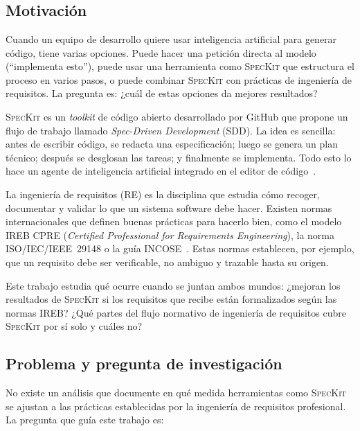 \chapter{\introductionname}
\label{chap:introduccion}

\section{Motivaci\'on}

Cuando un equipo de desarrollo quiere usar inteligencia artificial para generar c\'odigo, tiene varias opciones. Puede hacer una petici\'on directa al modelo (``implementa esto''), puede usar una herramienta como \textsc{SpecKit} que estructura el proceso en varios pasos, o puede combinar \textsc{SpecKit} con pr\'acticas de ingenier\'ia de requisitos. La pregunta es: ¿cu\'al de estas opciones da mejores resultados?

\textsc{SpecKit} es un \emph{toolkit} de c\'odigo abierto desarrollado por GitHub que propone un flujo de trabajo llamado \emph{Spec-Driven Development} (SDD). La idea es sencilla: antes de escribir c\'odigo, se redacta una especificaci\'on; luego se genera un plan t\'ecnico; despu\'es se desglosan las tareas; y finalmente se implementa. Todo esto lo hace un agente de inteligencia artificial integrado en el editor de c\'odigo~\cite{speckit_repo,speckit_sdd}.

La ingenier\'ia de requisitos (RE) es la disciplina que estudia c\'omo recoger, documentar y validar lo que un sistema software debe hacer. Existen normas internacionales que definen buenas pr\'acticas para hacerlo bien, como el modelo IREB CPRE (\emph{Certified Professional for Requirements Engineering}), la norma ISO/IEC/IEEE~29148 o la gu\'ia INCOSE~\cite{cpre,iso29148,incose}. Estas normas establecen, por ejemplo, que un requisito debe ser verificable, no ambiguo y trazable hasta su origen.

Este trabajo estudia qu\'e ocurre cuando se juntan ambos mundos: ¿mejoran los resultados de \textsc{SpecKit} si los requisitos que recibe est\'an formalizados seg\'un las normas IREB? ¿Qu\'e partes del flujo normativo de ingenier\'ia de requisitos cubre \textsc{SpecKit} por s\'i solo y cu\'ales no?

\section{Problema y pregunta de investigaci\'on}

No existe un an\'alisis que documente en qu\'e medida herramientas como \textsc{SpecKit} se ajustan a las pr\'acticas establecidas por la ingenier\'ia de requisitos profesional. La pregunta que gu\'ia este trabajo es:

